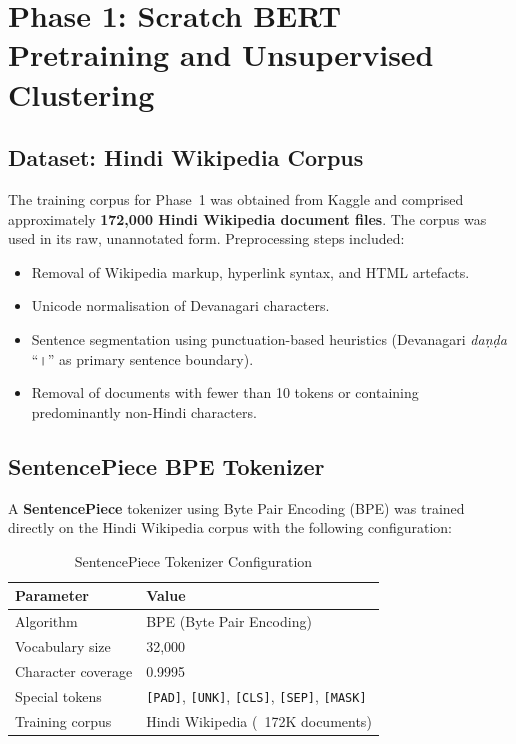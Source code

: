 \documentclass[12pt,a4paper]{report}
\begin{document}
\section{Phase 1: Scratch BERT Pretraining and Unsupervised Clustering}

\subsection{Dataset: Hindi Wikipedia Corpus}

The training corpus for Phase~1 was obtained from Kaggle and comprised approximately \textbf{172,000 Hindi Wikipedia document files}. The corpus was used in its raw, unannotated form. Preprocessing steps included:

\begin{itemize}
    \item Removal of Wikipedia markup, hyperlink syntax, and HTML artefacts.
    \item Unicode normalisation of Devanagari characters.
    \item Sentence segmentation using punctuation-based heuristics (Devanagari \textit{daṇḍa} ``।'' as primary sentence boundary).
    \item Removal of documents with fewer than 10 tokens or containing predominantly non-Hindi characters.
\end{itemize}

\subsection{SentencePiece BPE Tokenizer}

A \textbf{SentencePiece} tokenizer using Byte Pair Encoding (BPE) was trained directly on the Hindi Wikipedia corpus with the following configuration:

\begin{table}[H]
\centering
\caption{SentencePiece Tokenizer Configuration}
\begin{tabular}{|l|l|}
\hline
\textbf{Parameter} & \textbf{Value} \\
\hline
Algorithm & BPE (Byte Pair Encoding) \\
Vocabulary size & 32,000 \\
Character coverage & 0.9995 \\
Special tokens & \texttt{[PAD]}, \texttt{[UNK]}, \texttt{[CLS]}, \texttt{[SEP]}, \texttt{[MASK]} \\
Training corpus & Hindi Wikipedia (~172K documents) \\
\hline
\end{tabular}
\end{table}
\end{document}
